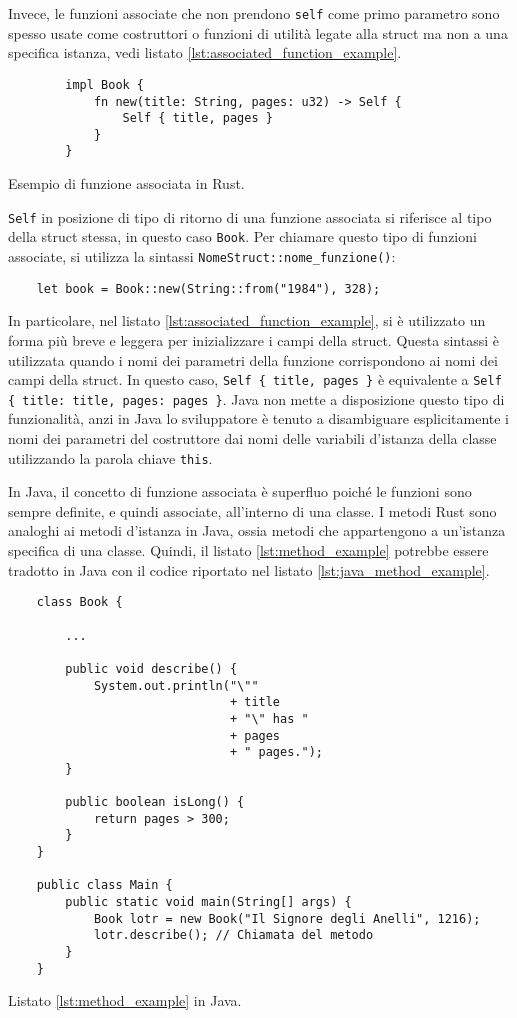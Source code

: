 Invece, le funzioni associate che non prendono \texttt{self} come primo parametro sono spesso usate come costruttori o funzioni di utilità legate alla struct ma non a una specifica istanza, vedi listato \ref{lst:associated_function_example}.
\begin{listing}
    \begin{verbatim}
        impl Book {
            fn new(title: String, pages: u32) -> Self {
                Self { title, pages }
            }
        }
    \end{verbatim}
    \caption{Esempio di funzione associata in Rust.}
    \label{lst:associated_function_example}
\end{listing}
\texttt{Self} in posizione di tipo di ritorno di una funzione associata si riferisce al tipo della struct stessa, in questo caso \texttt{Book}. Per chiamare questo tipo di funzioni associate, si utilizza la sintassi \texttt{NomeStruct::nome\_funzione()}:
\begin{verbatim}
    let book = Book::new(String::from("1984"), 328);
\end{verbatim}
In particolare, nel listato \ref{lst:associated_function_example}, si è utilizzato un forma più breve e leggera per inizializzare i campi della struct. Questa sintassi è utilizzata quando i nomi dei parametri della funzione corrispondono ai nomi dei campi della struct. In questo caso, \texttt{Self \{ title, pages \}} è equivalente a \texttt{Self \{ title: title, pages: pages \}}. Java non mette a disposizione questo tipo di funzionalità, anzi in Java lo sviluppatore è tenuto a disambiguare esplicitamente i nomi dei parametri del costruttore dai nomi delle variabili d'istanza della classe utilizzando la parola chiave \texttt{this}.

In Java, il concetto di funzione associata è superfluo poiché le funzioni sono sempre definite, e quindi associate, all'interno di una classe. I metodi Rust sono analoghi ai metodi d'istanza in Java, ossia metodi che appartengono a un'istanza specifica di una classe. Quindi, il listato \ref{lst:method_example} potrebbe essere tradotto in Java con il codice riportato nel listato \ref{lst:java_method_example}.
\begin{listing}
\begin{verbatim}
    class Book {
        
        ...

        public void describe() {
            System.out.println("\"" 
                               + title 
                               + "\" has " 
                               + pages 
                               + " pages.");
        }

        public boolean isLong() {
            return pages > 300;
        }
    }

    public class Main {
        public static void main(String[] args) {
            Book lotr = new Book("Il Signore degli Anelli", 1216);
            lotr.describe(); // Chiamata del metodo
        }
    }
\end{verbatim}
    \caption{Listato \ref{lst:method_example} in Java.}
    \label{lst:java_method_example}
\end{listing}

